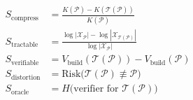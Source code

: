 \begin{align}
S_{\text{compress}} &= \frac{K(\mathcal{P}) - K(\mathcal{T}(\mathcal{P}))}{K(\mathcal{P})} \\[6pt]
S_{\text{tractable}} &= \frac{\log|\mathcal{X}_{\mathcal{P}}| - \log|\mathcal{X}_{\mathcal{T}(\mathcal{P})}|}{\log|\mathcal{X}_{\mathcal{P}}|} \\[6pt]
S_{\text{verifiable}} &= V_{\text{build}}(\mathcal{T}(\mathcal{P})) - V_{\text{build}}(\mathcal{P}) \\[6pt]
S_{\text{distortion}} &= \mathrm{Risk}\!\bigl(\mathcal{T}(\mathcal{P}) \not\equiv \mathcal{P}\bigr) \\[6pt]
S_{\text{oracle}} &= H\bigl(\text{verifier for }\mathcal{T}(\mathcal{P})\bigr)
\end{align}

